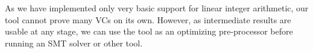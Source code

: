 As we have implemented only very basic support for linear integer arithmetic, our tool cannot prove many VCs on its own. 
However, as intermediate results are usable at any stage, 
we can use the tool as an optimizing pre-processor before running an SMT solver or other tool.





